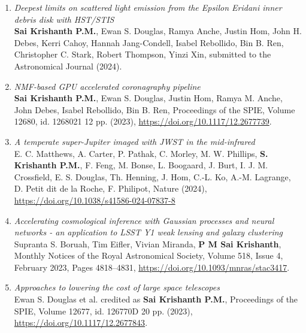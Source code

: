 \documentclass[11pt]{article}
\begin{document}
\begin{enumerate} 
    \item \textit{Deepest limits on scattered light emission from the Epsilon Eridani inner debris disk with HST/STIS} \\
    \textbf{Sai Krishanth P.M.}, Ewan S. Douglas, Ramya Anche, Justin Hom, John H. Debes, Kerri Cahoy, Hannah Jang-Condell, 
	Isabel Rebollido, Bin B. Ren, Christopher C. Stark, Robert Thompson, Yinzi Xin, submitted to the Astronomical Journal (2024).
    \item \textit{NMF-based GPU accelerated coronagraphy pipeline}\\ \textbf{Sai Krishanth P.M.}, Ewan S. Douglas, Justin Hom, Ramya M. Anche, John Debes, Isabel Rebollido, Bin B. Ren, Proceedings of the SPIE, Volume 12680, id. 1268021 12 pp. (2023), \url{https://doi.org/10.1117/12.2677739}.
    \item \textit{A temperate super-Jupiter imaged with JWST in the mid-infrared}\\ E. C. Matthews, A. Carter, P. Pathak, C. Morley, M. W. Phillips, \textbf{S. Krishanth P.M.}, F. Feng, M. Bonse, L. Boogaard, J. Burt, I. J. M. Crossfield, E. S. Douglas, Th. Henning, J. Hom, C.-L. Ko, A.-M. Lagrange, D. Petit dit de la Roche, F. Philipot, Nature (2024), \url{https://doi.org/10.1038/s41586-024-07837-8}
    \item \textit{Accelerating cosmological inference with Gaussian processes and neural networks - an application to LSST Y1 weak lensing and galaxy clustering}\\
    Supranta S. Boruah, Tim Eifler, Vivian Miranda, \textbf{P M Sai Krishanth}, Monthly Notices of the Royal Astronomical Society, Volume 518, Issue 4, February 2023, Pages 4818–4831, \url{https://doi.org/10.1093/mnras/stac3417}. 
    \item \textit{Approaches to lowering the cost of large space telescopes}\\
    Ewan S. Douglas et al. credited as \textbf{Sai Krishanth P.M.}, Proceedings of the SPIE, Volume 12677, id. 126770D 20 pp. (2023), \url{https://doi.org/10.1117/12.2677843}.
\end{enumerate}
\end{document}
